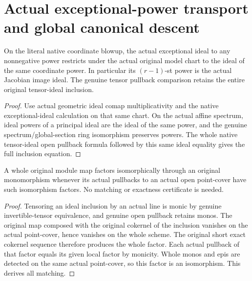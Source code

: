 \section{Actual exceptional-power transport and global canonical descent}

\begin{lemma}
\label{lem:kn-blowup-canonical-exceptional-power-chart}
\leanok
{}
On the literal native coordinate blowup, the actual exceptional ideal to
any nonnegative power restricts under the actual original model chart to
the ideal of the same coordinate power. In particular its $(r-1)$-st
power is the actual Jacobian image ideal. The genuine tensor pullback
comparison retains the entire original tensor-ideal inclusion.
\end{lemma}
\begin{proof}
Use actual geometric ideal comap multiplicativity and the native
exceptional-ideal calculation on that same chart. On the actual affine
spectrum, ideal powers of a principal ideal are the ideal of the same
power, and the genuine spectrum/global-section ring isomorphism preserves
powers. The whole native tensor-ideal open pullback formula followed by
this same ideal equality gives the full inclusion equation.
\end{proof}

\begin{lemma}
\label{lem:kn-blowup-canonical-open-descent}
\leanok
A whole original module map factors isomorphically through an original
monomorphism whenever its actual pullbacks to an actual open point-cover
have such isomorphism factors. No matching or exactness certificate is
needed.
\end{lemma}
\begin{proof}
Tensoring an ideal inclusion by an actual line is monic by genuine
invertible-tensor equivalence, and genuine open pullback retains monos.
The original map composed with the original cokernel of the inclusion
vanishes on the actual point-cover, hence vanishes on the whole scheme.
The original short exact cokernel sequence therefore produces the whole
factor. Each actual pullback of that factor equals its given local factor
by monicity. Whole monos and epis are detected on the same actual
point-cover, so this factor is an isomorphism. This derives all matching.
\end{proof}

